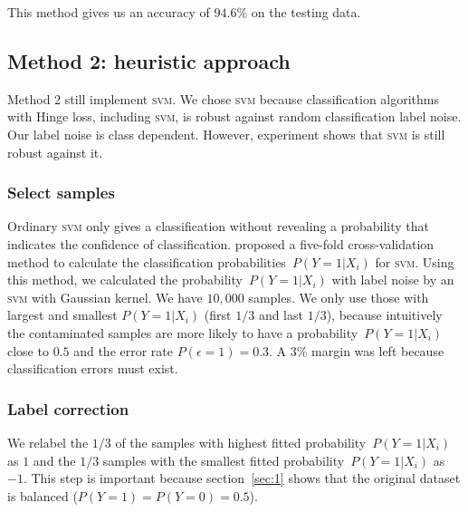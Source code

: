 \documentclass{article} %
\begin{document}



This method gives us an accuracy of $94.6\%$ on the testing data.

\subsection{Method 2: heuristic approach}
Method 2 still implement \textsc{svm}. We chose \textsc{svm} because classification algorithms with Hinge loss, including \textsc{svm}, is robust against random classification label noise. Our label noise is class dependent. However, experiment shows that \textsc{svm} is still robust against it.

\subsubsection{Select samples}
Ordinary \textsc{svm} only gives a classification without revealing a probability that indicates the confidence of classification. \citet{Wu03probabilityestimates} proposed a five-fold cross-validation method to calculate the classification probabilities~$P(Y=1|X_i)$ for \textsc{svm}. 
Using this method, we calculated the probability~$P(Y=1|X_i)$ with label noise by an \textsc{svm} with Gaussian kernel. We have $10,000$ samples. We only use those with largest and smallest $P(Y=1|X_i)$ (first $1/3$ and last $1/3$), because intuitively the contaminated samples are more likely to have a probability~$P(Y=1|X_i)$ close to $0.5$ and the error rate $P(\epsilon=1)=0.3$. A $3\%$ margin was left because classification errors must exist.
\subsubsection{Label correction}
We relabel the $1/3$ of the samples with highest fitted probability~$P(Y=1|X_i)$ as $1$ and the $1/3$ samples with the smallest fitted probability~$P(Y=1|X_i)$ as $-1$. This step is important because section~\ref{sec:1} shows that the original dataset is balanced ($P(Y=1)=P(Y=0)=0.5$). 
\end{document}
